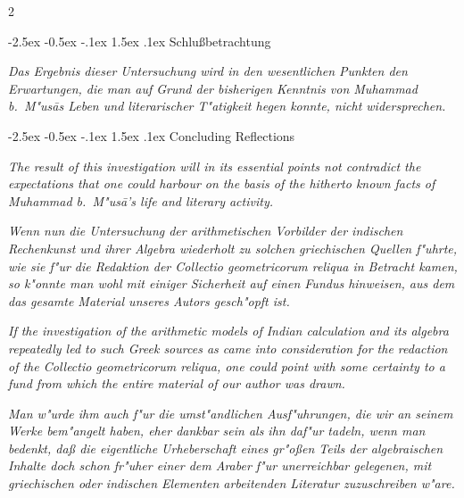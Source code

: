 \documentclass[10pt,a4paper]{article}
\makeatletter
\renewcommand{\section}{\@startsection{section}{1}{\z@}%
  {-2.5ex \@plus -0.5ex \@minus -.1ex}%
  {1.5ex \@plus .1ex}%
  {\normalfont\large\bfseries\color{sectioncolor}}}
\makeatother
\begin{document}
\clearpage

\begin{paracol}{2}

\section{Schlu\ss{}betrachtung}

\textit{Das Ergebnis dieser Untersuchung wird in den wesentlichen Punkten den Erwartungen, die man auf Grund der bisherigen Kenntnis von Muhammad b.\ M"us\=as Leben und literarischer T"atigkeit hegen konnte, nicht widersprechen.}

\switchcolumn

\section{Concluding Reflections}

\textit{The result of this investigation will in its essential points not contradict the expectations that one could harbour on the basis of the hitherto known facts of Muhammad b.\ M"us\=a's life and literary activity.}

\switchcolumn*

\textit{Wenn nun die Untersuchung der arithmetischen Vorbilder der indischen Rechenkunst und ihrer Algebra wiederholt zu solchen griechischen Quellen f"uhrte, wie sie f"ur die Redaktion der \textit{Collectio geometricorum reliqua} in Betracht kamen, so k"onnte man wohl mit einiger Sicherheit auf einen Fundus hinweisen, aus dem das gesamte Material unseres Autors gesch"opft ist.}

\switchcolumn

\textit{If the investigation of the arithmetic models of Indian calculation and its algebra repeatedly led to such Greek sources as came into consideration for the redaction of the \textit{Collectio geometricorum reliqua}, one could point with some certainty to a fund from which the entire material of our author was drawn.}

\switchcolumn*

\textit{Man w"urde ihm auch f"ur die umst"andlichen Ausf"uhrungen, die wir an seinem Werke bem"angelt haben, eher dankbar sein als ihn daf"ur tadeln, wenn man bedenkt, da\ss{} die eigentliche Urheberschaft eines gr"o\ss{}en Teils der algebraischen Inhalte doch schon fr"uher einer dem Araber f"ur unerreichbar gelegenen, mit griechischen oder indischen Elementen arbeitenden Literatur zuzuschreiben w"are.}


\end{paracol}
\end{document}
